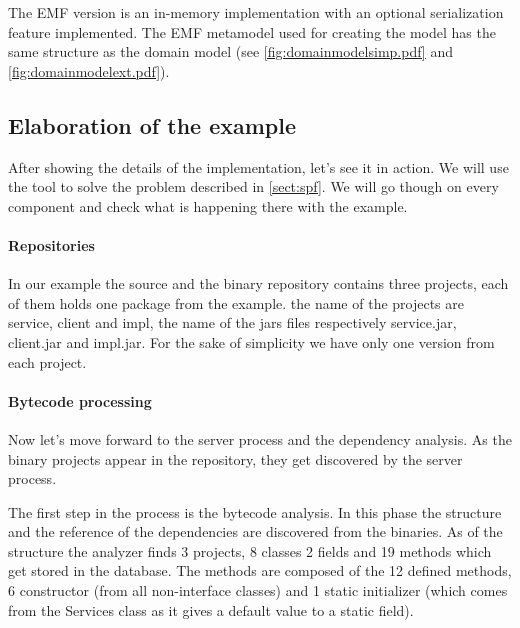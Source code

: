 The EMF version is an in-memory implementation with an optional serialization
feature implemented. The EMF metamodel used for creating the model has the same
structure as the domain model (see \autoref{fig:domainmodelsimp.pdf} and
\autoref{fig:domainmodelext.pdf}).



\subsection{Elaboration of the example}
After showing the details of the implementation, let's see it in action.
We will use the tool to solve the problem described in \autoref{sect:spf}. We
will go though on every component and check what is happening there with the
example. 

\paragraph{Repositories}
In our example the source and the binary
repository contains three projects, each of them holds one package from the
example. the name of the projects are service, client and impl, the name of 
the jars files respectively service.jar, client.jar and impl.jar. For the sake
of simplicity we have only one version from each project. 

\paragraph{Bytecode processing}
Now let's move forward to the server process and the dependency analysis. As 
the binary projects appear in the repository, they get discovered by the 
server process. 

The first step in the process is the bytecode analysis. In this phase the
structure and the reference of the dependencies are discovered from the
binaries. As of the structure the analyzer finds 3 projects, 8 classes 2 fields
and 19 methods which get stored in the database.
The methods are composed of the 12 defined methods, 6 constructor (from all
non-interface classes) and 1 static initializer (which comes from the Services
class as it gives a default value to a static field).

